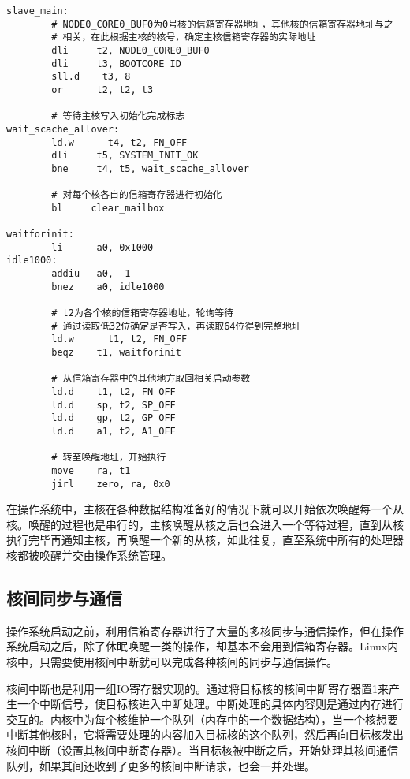 \documentclass[]{ctexbook}
\begin{document}
\begin{verbatim}
slave_main:
        # NODE0_CORE0_BUF0为0号核的信箱寄存器地址，其他核的信箱寄存器地址与之
        # 相关，在此根据主核的核号，确定主核信箱寄存器的实际地址
        dli     t2, NODE0_CORE0_BUF0
        dli     t3, BOOTCORE_ID
        sll.d    t3, 8
        or      t2, t2, t3

        # 等待主核写入初始化完成标志
wait_scache_allover:
        ld.w      t4, t2, FN_OFF
        dli     t5, SYSTEM_INIT_OK
        bne     t4, t5, wait_scache_allover

        # 对每个核各自的信箱寄存器进行初始化
        bl     clear_mailbox

waitforinit:
        li      a0, 0x1000
idle1000:
        addiu   a0, -1
        bnez    a0, idle1000

        # t2为各个核的信箱寄存器地址，轮询等待
        # 通过读取低32位确定是否写入，再读取64位得到完整地址
        ld.w      t1, t2, FN_OFF
        beqz    t1, waitforinit

        # 从信箱寄存器中的其他地方取回相关启动参数
        ld.d    t1, t2, FN_OFF
        ld.d    sp, t2, SP_OFF
        ld.d    gp, t2, GP_OFF
        ld.d    a1, t2, A1_OFF

        # 转至唤醒地址，开始执行
        move    ra, t1
        jirl    zero, ra, 0x0
\end{verbatim}

在操作系统中，主核在各种数据结构准备好的情况下就可以开始依次唤醒每一个从核。唤醒的过程也是串行的，主核唤醒从核之后也会进入一个等待过程，直到从核执行完毕再通知主核，再唤醒一个新的从核，如此往复，直至系统中所有的处理器核都被唤醒并交由操作系统管理。

\hypertarget{ux6838ux95f4ux540cux6b65ux4e0eux901aux4fe1}{%
\subsection{核间同步与通信}\label{ux6838ux95f4ux540cux6b65ux4e0eux901aux4fe1}}

操作系统启动之前，利用信箱寄存器进行了大量的多核同步与通信操作，但在操作系统启动之后，除了休眠唤醒一类的操作，却基本不会用到信箱寄存器。Linux内核中，只需要使用核间中断就可以完成各种核间的同步与通信操作。

核间中断也是利用一组IO寄存器实现的。通过将目标核的核间中断寄存器置1来产生一个中断信号，使目标核进入中断处理。中断处理的具体内容则是通过内存进行交互的。内核中为每个核维护一个队列（内存中的一个数据结构），当一个核想要中断其他核时，它将需要处理的内容加入目标核的这个队列，然后再向目标核发出核间中断（设置其核间中断寄存器）。当目标核被中断之后，开始处理其核间通信队列，如果其间还收到了更多的核间中断请求，也会一并处理。
\end{document}
